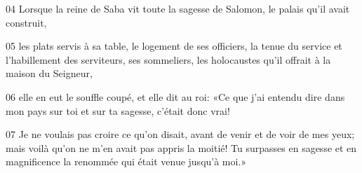 
04 Lorsque la reine de Saba vit toute la sagesse de Salomon, le palais qu’il avait construit,

05 les plats servis à sa table, le logement de ses officiers, la tenue du service et l’habillement des serviteurs, ses sommeliers, les holocaustes qu’il offrait à la maison du Seigneur,

06 elle en eut le souffle coupé, et elle dit au roi: «Ce que j’ai entendu dire dans mon pays sur toi et sur ta sagesse, c’était donc vrai!

07 Je ne voulais pas croire ce qu’on disait, avant de venir et de voir de mes yeux; mais voilà qu’on ne m’en avait pas appris la moitié! Tu surpasses en sagesse et en magnificence la renommée qui était venue jusqu’à moi.»

